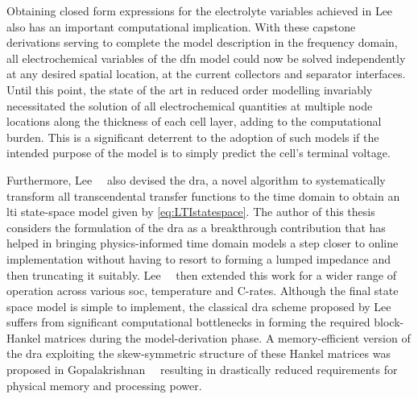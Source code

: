 Obtaining  closed form  expressions for  the electrolyte  variables achieved  in
Lee~\etal{} also has an important computational implication. With these capstone
derivations serving to  complete the model description in  the frequency domain,
all  electrochemical  variables of  the  \gls{dfn}  model  could now  be  solved
independently at any  desired spatial location, \eg{} at  the current collectors
and separator  interfaces. Until  this point,  the state of  the art  in reduced
order  modelling invariably  necessitated  the solution  of all  electrochemical
quantities at  multiple node locations along  the thickness of each  cell layer,
adding  to the  computational burden.  This is  a significant  deterrent to  the
adoption  of such  models if  the intended  purpose of  the model  is to  simply
predict the cell's terminal voltage.


Furthermore,  Lee~\etal{}~\cite{Lee2012a} also  devised the  \gls{dra}, a  novel
algorithm  to systematically  transform  all  transcendental transfer  functions
to  the  time domain   to  obtain  an \gls{lti}  state-space   model  given  by
\cref{eq:LTIstatespace}. The  author of  this thesis  considers the  formulation of
the  \gls{dra}  as a  breakthrough  contribution  that  has helped  in  bringing
physics-informed  time domain  models a  step  closer  to online  implementation
without   having  to   resort   to   forming  a   lumped   impedance  and   then
truncating  it  suitably.  Lee~\etal{}~\cite{Lee2014} then  extended  this  work
for  a  wider range  of  operation  across  various \gls{soc},  temperature  and
C-rates.  Although the  final  state space  model is  simple  to implement,  the
classical  \gls{dra} scheme  proposed  by Lee~\etal{}  suffers from  significant
computational bottlenecks  in forming the required  block-Hankel matrices during
the  model-derivation  phase.  A   memory-efficient  version  of  the  \gls{dra}
exploiting the  skew-symmetric structure of  these Hankel matrices  was proposed
in  Gopalakrishnan~\etal{}~\cite{Gopalakrishnan2017}  resulting  in  drastically
reduced requirements for physical memory and processing power.


